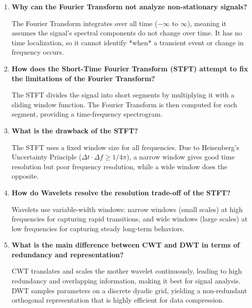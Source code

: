 \documentclass[12pt,a4paper]{article}
\newcommand{\Q}[1]{\textbf{#1}\par\noindent\ignorespaces}
\begin{document}
\begin{tcolorbox}[exambox, title={\textbf{Frequently Asked / Viva Questions}}]
\begin{enumerate}[topsep=0pt, label=\textbf{Q\arabic*.}, itemsep=5pt]
  \item \Q{Why can the Fourier Transform not analyze non-stationary signals?}
        The Fourier Transform integrates over all time ($-\infty$ to $\infty$), meaning it assumes the signal's spectral components do not change over time. It has no time localization, so it cannot identify *when* a transient event or change in frequency occurs.

  \item \Q{How does the Short-Time Fourier Transform (STFT) attempt to fix the limitations of the Fourier Transform?}
        The STFT divides the signal into short segments by multiplying it with a sliding window function. The Fourier Transform is then computed for each segment, providing a time-frequency spectrogram.

  \item \Q{What is the drawback of the STFT?}
        The STFT uses a fixed window size for all frequencies. Due to Heisenberg's Uncertainty Principle ($\Delta t \cdot \Delta f \ge 1/4\pi$), a narrow window gives good time resolution but poor frequency resolution, while a wide window does the opposite.

  \item \Q{How do Wavelets resolve the resolution trade-off of the STFT?}
        Wavelets use variable-width windows: narrow windows (small scales) at high frequencies for capturing rapid transitions, and wide windows (large scales) at low frequencies for capturing steady long-term behaviors.

  \item \Q{What is the main difference between CWT and DWT in terms of redundancy and representation?}
        CWT translates and scales the mother wavelet continuously, leading to high redundancy and overlapping information, making it best for signal analysis. DWT samples parameters on a discrete dyadic grid, yielding a non-redundant orthogonal representation that is highly efficient for data compression.
\end{enumerate}
\end{tcolorbox}
\end{document}
